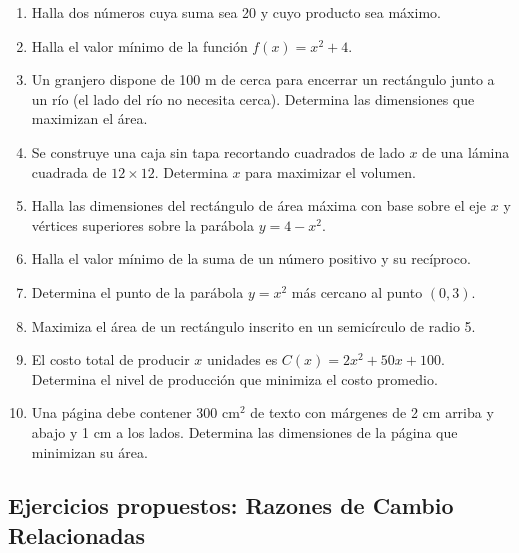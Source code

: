 \documentclass[12pt, letterpaper]{article}
\begin{document}
\begin{enumerate}[resume=ejercicios, leftmargin=*]
  \item \facil{} Halla dos números cuya suma sea 20 y cuyo producto sea máximo.

  \item \facil{} Halla el valor mínimo de la función $f(x) = x^2 + 4$.

  \item \medio{} Un granjero dispone de 100 m de cerca para encerrar un rectángulo junto a un río (el lado del río no necesita cerca). Determina las dimensiones que maximizan el área.

  \item \medio{} Se construye una caja sin tapa recortando cuadrados de lado $x$ de una lámina cuadrada de $12 \times 12$. Determina $x$ para maximizar el volumen.

  \item \medio{} Halla las dimensiones del rectángulo de área máxima con base sobre el eje $x$ y vértices superiores sobre la parábola $y = 4 - x^2$.

  \item \dificil{} Halla el valor mínimo de la suma de un número positivo y su recíproco.

  \item \dificil{} Determina el punto de la parábola $y = x^2$ más cercano al punto $(0, 3)$.

  \item \dificil{} Maximiza el área de un rectángulo inscrito en un semicírculo de radio 5.

  \item \dificil{} El costo total de producir $x$ unidades es $C(x) = 2x^2 + 50x + 100$. Determina el nivel de producción que minimiza el costo promedio.

  \item \muyDificil{} Una página debe contener 300 cm$^2$ de texto con márgenes de 2 cm arriba y abajo y 1 cm a los lados. Determina las dimensiones de la página que minimizan su área.
\end{enumerate}

\subsection{Ejercicios propuestos: Razones de Cambio Relacionadas}
\end{document}
